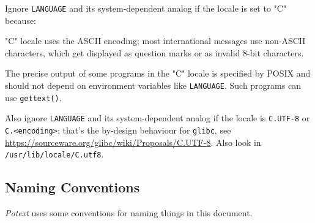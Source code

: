 \documentclass[
 11pt,
 twoside,
 a4paper,
 final                                 %
]{article}
\begin{document}
   Ignore \texttt{LANGUAGE} and its system-dependent analog if the locale is
   set to "C" because:

   \begin{enumber}
      \item "C" locale uses the ASCII encoding; most international
         messages use non-ASCII characters, which get displayed
         as question marks or as invalid 8-bit characters.
      \item The precise output of some programs in the "C" locale
         is specified by POSIX and should not depend on environment
         variables like \texttt{LANGUAGE}.  Such programs can use
         \texttt{gettext()}.
   \end{enumber}

   Also ignore \texttt{LANGUAGE} and its system-dependent analog if the
   locale is \texttt{C.UTF-8} or \texttt{C.<encoding>}; that's
   the by-design behaviour for \texttt{glibc}, see
   \url{https://sourceware.org/glibc/wiki/Proposals/C.UTF-8}.
   Also look in \texttt{/usr/lib/locale/C.utf8}.

\subsection{Naming Conventions}
\label{subsec:introduction_conventions}

   \textsl{Potext} uses some conventions for naming things in this
   document.
\end{document}
